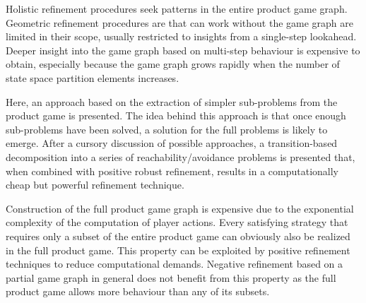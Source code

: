 Holistic refinement procedures seek patterns in the entire product game graph.
Geometric refinement procedures are that can work without the game graph are limited in their scope, usually restricted to insights from a single-step lookahead. 
Deeper insight into the game graph based on multi-step behaviour is expensive to obtain, especially because the game graph grows rapidly when the number of state space partition elements increases.

Here, an approach based on the extraction of simpler sub-problems from the product game is presented.
The idea behind this approach is that once enough sub-problems have been solved, a solution for the full problems is likely to emerge.
After a cursory discussion of possible approaches, a transition-based decomposition into a series of reachability/avoidance problems is presented that, when combined with positive robust refinement, results in a computationally cheap but powerful refinement technique.


\startsubsection[title={Subset Approaches}]

    Construction of the full product game graph is expensive due to the exponential complexity of the computation of player actions.
    Every satisfying strategy that requires only a subset of the entire product game can obviously also be realized in the full product game.
    This property can be exploited by positive refinement techniques to reduce computational demands.
    Negative refinement based on a partial game graph in general does not benefit from this property as the full product game allows more behaviour than any of its subsets.

